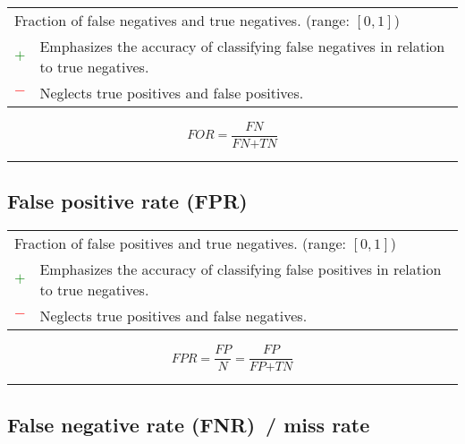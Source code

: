 \documentclass{article}
\begin{document}
\begin{table}[H]\centering
	\begin{tabular}{m{}m{}}
		\multicolumn{2}{m{0.95\textwidth}}{Fraction of false negatives and true negatives. (range: $[0, 1]$)} \\
		\textcolor{Green}{$+$} & Emphasizes the accuracy of classifying false negatives in relation to true negatives. \\
		\textcolor{Red}{$-$}   & Neglects true positives and false positives.
	\end{tabular}
\end{table}

\begin{equation}
	\textit{FOR} = \dfrac{\textit{FN}}{\textit{FN} + \textit{TN}}
%
	\label{equation:FOR}
\end{equation}

\hrule


\subsection[False positive rate (FPR)]{False positive rate (FPR) \cite{banerjee2009hypothesis}}

\begin{table}[H]\centering
	\begin{tabular}{m{}m{}}
		\multicolumn{2}{m{0.95\textwidth}}{Fraction of false positives and true negatives. (range: $[0, 1]$)} \\
		\textcolor{Green}{$+$} & Emphasizes the accuracy of classifying false positives in relation to true negatives. \\
		\textcolor{Red}{$-$}   & Neglects true positives and false negatives.
	\end{tabular}
\end{table}

\begin{equation}
	\textit{FPR} = \dfrac{\textit{FP}}{\textit{N}} = \dfrac{\textit{FP}}{\textit{FP} + \textit{TN}}
%
	\label{equation:FPR}
\end{equation}

\hrule


\subsection[False negative rate (FNR)~/ miss rate]{False negative rate (FNR)~/ miss rate \cite{banerjee2009hypothesis}}
\end{document}
